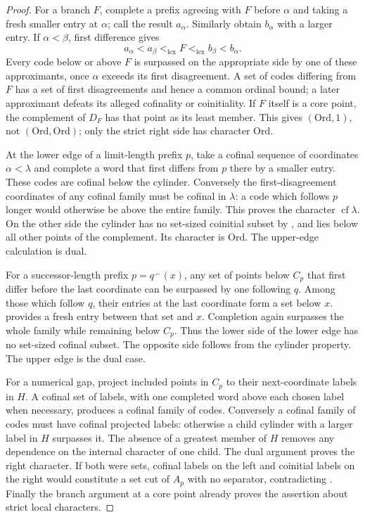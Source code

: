 \documentclass[11pt]{article}
\theoremstyle{definition}
\theoremstyle{remark}
\newcommand{\Ord}{\mathrm{Ord}}
\newcommand{\lex}{\mathrm{lex}}
\newcommand{\cf}{\operatorname{cf}}
\newcommand{\cat}{\mathbin{{}^\frown}}
\begin{document}
\begin{proof}
For a branch $F$, complete a prefix agreeing with $F$ before $\alpha$
and taking a fresh smaller entry at $\alpha$; call the result
$a_\alpha$. Similarly obtain $b_\alpha$ with a larger entry. If
$\alpha<\beta$, first difference gives
\[
 a_\alpha<a_\beta <_{\lex} F<_{\lex} b_\beta<b_\alpha.
\]
Every code below or above $F$ is surpassed on the appropriate side by
one of these approximants, once $\alpha$ exceeds its first disagreement.
A set of codes differing from $F$ has a set of first disagreements and
hence a common ordinal bound; a later approximant defeats its alleged
cofinality or coinitiality. If $F$ itself is a core point, the complement
of $D_F$ has that point as its least member. This gives $(\Ord,1)$,
not $(\Ord,\Ord)$; only the strict right side has character $\Ord$.

At the lower edge of a limit-length prefix $p$, take a cofinal sequence
of coordinates $\alpha<\lambda$ and complete a word that first differs
from $p$ there by a smaller entry. These codes are cofinal below the
cylinder. Conversely the first-disagreement coordinates of any cofinal
family must be cofinal in $\lambda$: a code which follows $p$ longer
would otherwise be above the entire family. This proves the character
$\cf\lambda$. On the other side the cylinder has no set-sized
coinitial subset by , and lies below
all other points of the complement. Its character is $\Ord$. The
upper-edge calculation is dual.

For a successor-length prefix $p=q\cat(x)$, any set of points below
$C_p$ that first differ before the last coordinate can be surpassed by
one following $q$. Among those which follow $q$, their entries at the
last coordinate form a set below $x$.  provides a
fresh entry between that set and $x$. Completion again surpasses the
whole family while remaining below $C_p$. Thus the lower side of the
lower edge has no set-sized cofinal subset. The opposite side follows
from the cylinder property. The upper edge is the dual case.

For a numerical gap, project included points in $C_p$ to their
next-coordinate labels in $H$. A cofinal set of labels, with one
completed word above each chosen label when necessary, produces a
cofinal family of codes. Conversely a cofinal family of codes must
have cofinal projected labels: otherwise a child cylinder with a
larger label in $H$ surpasses it. The absence of a greatest member of
$H$ removes any dependence on the internal character of one child.
The dual argument proves the right character. If both were sets,
cofinal labels on the left and coinitial labels on the right would
constitute a set cut of $A_p$ with no separator, contradicting
. Finally the branch argument at a core point
already proves the assertion about strict local characters.
\end{proof}
\end{document}
